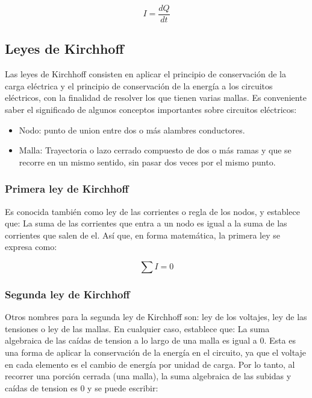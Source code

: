 \documentclass[letterpaper, 12pt]{article}
\begin{document}
\begin{equation}
	I = \frac{dQ}{dt}
\end{equation}

\subsection{Leyes de Kirchhoff}

Las leyes de Kirchhoff consisten en aplicar el principio de
conservación de la carga eléctrica y el principio de
conservación de la energía a los circuitos eléctricos, con
la finalidad de resolver los que tienen varias mallas. Es
conveniente saber el significado de algunos conceptos
importantes sobre circuitos eléctricos:

\begin{itemize}[label=$\triangleright$]
	\item Nodo: punto de union entre dos o más alambres conductores.
	\item Malla: Trayectoria o lazo cerrado compuesto de dos o más
	      ramas y que se recorre en un mismo sentido, sin pasar dos
	      veces por el mismo punto.
\end{itemize}

\subsubsection{Primera ley de Kirchhoff}

Es conocida también como ley de las corrientes o regla de
los nodos, y establece que: La suma de las corrientes que
entra a un nodo es igual a la suma de las corrientes que
salen de el. Así que, en forma matemática, la primera ley
se expresa como:

\begin{equation}
	\sum I = 0
\end{equation}

\subsubsection{Segunda ley de Kirchhoff}

Otros nombres para la segunda ley de Kirchhoff son: ley de
los voltajes, ley de las tensiones o ley de las mallas. En
cualquier caso, establece que: La suma algebraica de las
caídas de tension a lo largo de una malla es igual a 0.
Esta es una forma de aplicar la conservación de la energía
en el circuito, ya que el voltaje en cada elemento es el
cambio de energía por unidad de carga. Por lo tanto, al
recorrer una porción cerrada (una malla), la suma
algebraica de las subidas y caídas de tension es 0 y se
puede escribir:
\end{document}
